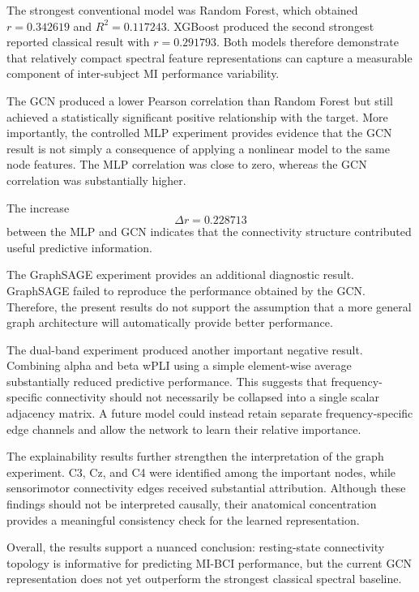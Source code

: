 \documentclass[conference]{IEEEtran}
\begin{document}
The strongest conventional model was Random Forest, which obtained $r = 0.342619$ and $R^2 = 0.117243$. XGBoost produced the second strongest reported classical result with $r = 0.291793$. Both models therefore demonstrate that relatively compact spectral feature representations can capture a measurable component of inter-subject MI performance variability.

The GCN produced a lower Pearson correlation than Random Forest but still achieved a statistically significant positive relationship with the target. More importantly, the controlled MLP experiment provides evidence that the GCN result is not simply a consequence of applying a nonlinear model to the same node features. The MLP correlation was close to zero, whereas the GCN correlation was substantially higher.

The increase
\begin{equation}
\Delta r = 0.228713
\end{equation}
between the MLP and GCN indicates that the connectivity structure contributed useful predictive information.

The GraphSAGE experiment provides an additional diagnostic result. GraphSAGE failed to reproduce the performance obtained by the GCN. Therefore, the present results do not support the assumption that a more general graph architecture will automatically provide better performance.

The dual-band experiment produced another important negative result. Combining alpha and beta wPLI using a simple element-wise average substantially reduced predictive performance. This suggests that frequency-specific connectivity should not necessarily be collapsed into a single scalar adjacency matrix. A future model could instead retain separate frequency-specific edge channels and allow the network to learn their relative importance.

The explainability results further strengthen the interpretation of the graph experiment. C3, Cz, and C4 were identified among the important nodes, while sensorimotor connectivity edges received substantial attribution. Although these findings should not be interpreted causally, their anatomical concentration provides a meaningful consistency check for the learned representation.

Overall, the results support a nuanced conclusion: resting-state connectivity topology is informative for predicting MI-BCI performance, but the current GCN representation does not yet outperform the strongest classical spectral baseline.
\end{document}
